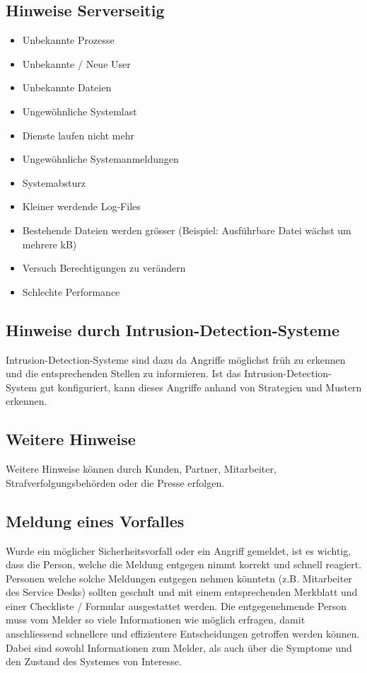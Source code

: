 \subsection{Hinweise Serverseitig}
\begin{itemize}
  \item Unbekannte Prozesse
  \item Unbekannte / Neue User
  \item Unbekannte Dateien
  \item Ungewöhnliche Systemlast
  \item Dienste laufen nicht mehr
  \item Ungewöhnliche Systemanmeldungen
  \item Systemabsturz
  \item Kleiner werdende Log-Files
  \item Bestehende Dateien werden grösser (Beispiel: Ausführbare Datei wächst um mehrere kB)
  \item Versuch Berechtigungen zu verändern
  \item Schlechte Performance
\end{itemize}

\subsection{Hinweise durch Intrusion-Detection-Systeme}
Intrusion-Detection-Systeme sind dazu da Angriffe möglichst früh zu erkennen und die entsprechenden Stellen zu informieren. Ist das Intrusion-Detection-System gut konfiguriert, kann dieses Angriffe anhand von Strategien und Mustern erkennen.



\subsection{Weitere Hinweise}
Weitere Hinweise können durch Kunden, Partner, Mitarbeiter, Strafverfolgungsbehörden oder die Presse erfolgen.

\subsection{Meldung eines Vorfalles}\label{subsec:Angriff:MeldungVorfall}
Wurde ein möglicher Sicherheitsvorfall oder ein Angriff gemeldet, ist es wichtig, dass die Person, welche die Meldung entgegen nimmt korrekt und schnell reagiert. Personen welche solche Meldungen entgegen nehmen könntetn (z.B. Mitarbeiter des Service Desks) sollten geschult und mit einem entsprechenden Merkblatt und einer Checkliste / Formular ausgestattet werden. Die entgegenehmende Person muss vom Melder so viele Informationen wie möglich erfragen, damit anschliessend schnellere und effizientere Entscheidungen getroffen werden können. Dabei sind sowohl Informationen zum Melder, als auch über die Symptome und den Zustand des Systemes von Interesse.

